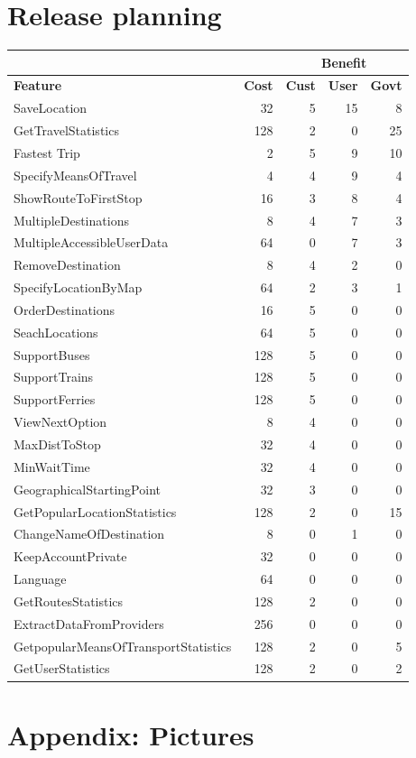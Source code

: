 \documentclass[a4paper]{article}
\begin{document}
	\section{Release planning}
		\begin{table}[h]
			\begin{tabular}{|l|r|r|r|r|} \hline
				\multicolumn{2}{|l|}{}	& \multicolumn{3}{c|}{\textbf{Benefit}} \\ \hline
				\textbf{Feature} & \textbf{Cost} & \textbf{Cust} & \textbf{User} & \textbf{Govt} \\ \hline
				SaveLocation	& 32 & 5 & 15 & 8 \\ 
				GetTravelStatistics	& 128 & 2 & 0 & 25 \\
				Fastest Trip	& 2 & 5 & 9 & 10 \\
				SpecifyMeansOfTravel	& 4 & 4	& 9 & 4 \\
				ShowRouteToFirstStop	& 16 & 3 & 8 & 4 \\
				MultipleDestinations	& 8 & 4 & 7 &3 \\
				MultipleAccessibleUserData	& 64 & 0 & 7 & 3 \\
				RemoveDestination	& 8 & 4 & 2 & 0 \\
				SpecifyLocationByMap	& 64 & 2 & 3 & 1 \\
				OrderDestinations	& 16 & 5 & 0 & 0 \\
				SeachLocations	& 64 &5 & 0 & 0 \\
				SupportBuses	& 128 & 5 & 0 & 0 \\
				SupportTrains	& 128 & 5 & 0 & 0 \\
				SupportFerries	& 128 & 5 & 0 & 0 \\
				ViewNextOption	& 8 & 4 & 0 & 0 \\
				MaxDistToStop	& 32 & 4 & 0 & 0 \\
				MinWaitTime	& 32 & 4 & 0 & 0 \\
				GeographicalStartingPoint	& 32 & 3 & 0 & 0 \\
				GetPopularLocationStatistics	& 128 & 2 & 0 & 15 \\ 
				ChangeNameOfDestination	& 8 & 0 & 1 & 0 \\
				KeepAccountPrivate	& 32 & 0 & 0 & 0 \\
				Language	& 64 & 0 & 0 & 0 \\
				GetRoutesStatistics	& 128 & 2 & 0 & 0 \\
				ExtractDataFromProviders	& 256 & 0 & 0 & 0 \\
				GetpopularMeansOfTransportStatistics	& 128 & 2 & 0 & 5 \\
				GetUserStatistics	& 128 & 2 & 0 & 2 \\ \hline
		\end{tabular}
	\end{table}
		
		
		
				
	\newpage

	\section{Appendix: Pictures} %
		\label{sec:appendix}
		
\end{document}
